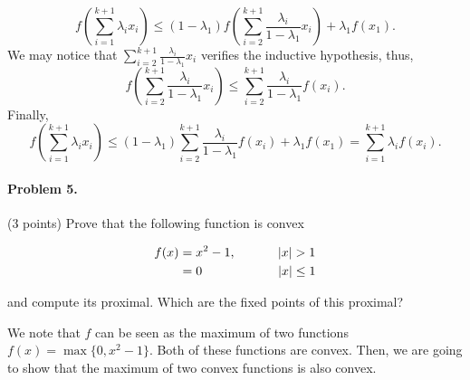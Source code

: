\documentclass[12pt]{scrartcl}
\begin{document}
\begin{itemize}
    \begin{equation*}
        f\left( \sum_{i=1}^{k+1} \lambda_i  x_i \right) \leq (1 - \lambda_1) f \left( \sum_{i=2}^{k+1} \frac{\lambda_i}{1-\lambda_1} x_i \right) + \lambda_1 f(x_1).
    \end{equation*}
    We may notice that $\sum_{i=2}^{k+1} \frac{\lambda_i}{1-\lambda_1} x_i$ verifies the inductive hypothesis, thus,
    \begin{equation*}
        f \left( \sum_{i=2}^{k+1} \frac{\lambda_i}{1-\lambda_1} x_i \right) \leq \sum_{i=2}^{k+1} \frac{\lambda_i}{1-\lambda_1} f(x_i).
    \end{equation*}
    Finally,
    \begin{equation*}
        f\left(\sum_{i=1}^{k+1} \lambda_i x_i \right) \leq (1-\lambda_1) \sum_{i = 2}^{k+1} \frac{\lambda_i}{1-\lambda_1}f(x_i) + \lambda_1 f(x_1) = \sum_{i=1}^{k+1} \lambda_i f(x_i).
    \end{equation*}
\end{itemize}


\vspace{0.5em}



\begin{boxF}
\paragraph*{Problem 5.} (3 points) \hspace{0.15em} Prove that the following function is convex

    \begin{align*}
        f(x) &= x^2 -1, \hspace{3.3em} |x| > 1 \\
             &= 0       \hspace{6em} |x| \leq 1
    \end{align*}

and compute its proximal. Which are the fixed points of this proximal?
\end{boxF}

We note that $f$ can be seen as the maximum of two functions $f(x) = \max\{0, x^2-1\}$. Both of these functions are convex. Then, we are going to show that the maximum of two convex functions is also convex. \\
\end{document}
